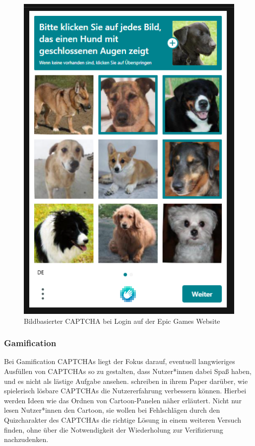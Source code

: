 \begin{figure}
    \centering
    \includegraphics{gfx/mygraphics/fuerfortnite.png}
    \caption{Bildbasierter CAPTCHA bei Login auf der Epic Games Website}   
    \label{fig:fortnite}
\end{figure}

\subsubsection*{Gamification}
Bei Gamification CAPTCHAs liegt der Fokus darauf, eventuell langwieriges Ausfüllen von CAPTCHAs so zu gestalten, dass Nutzer*innen dabei Spaß haben,
und es nicht als lästige Aufgabe ansehen.
\citeauthor{gamified} schreiben in ihrem Paper  darüber, wie spielerisch lösbare CAPTCHAs die Nutzererfahrung verbessern können.
Hierbei werden Ideen wie das Ordnen von Cartoon-Panelen näher erläutert.
Nicht nur lesen Nutzer*innen den Cartoon, sie wollen bei Fehlschlägen durch den Quizcharakter des CAPTCHAs die richtige Lösung in einem weiteren Versuch finden,
ohne über die Notwendigkeit der Wiederholung zur Verifizierung nachzudenken. \cite[p.41ff]{gamified}

